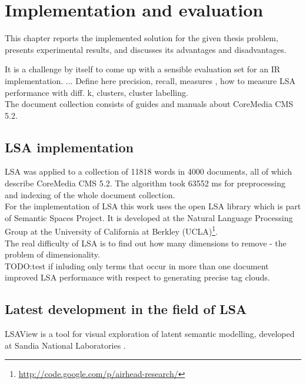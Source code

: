 \chapter{Implementation and evaluation}
\label{sec:implementation}

\begin{summary}
This chapter reports the implemented solution for the given thesis problem, presents experimental results, and discusses its advantages and disadvantages.
\end{summary}


It is a challenge by itself to come up with a sensible evaluation set for an IR implementation. ... Define here precision, recall, measures , how to measure LSA performance with  diff. k, clusters, cluster labelling. \\


The document collection consists of guides and manuals about CoreMedia \gls{CMS} 5.2.\\

\section{LSA implementation}
\label{sec:implementation:lsa_impl}
\gls{LSA} was applied to a collection of 11818 words in 4000 documents, all of which describe CoreMedia \gls{CMS} 5.2. The algorithm took  63552 ms for preprocessing and indexing of the whole document collection. \\

For the implementation of LSA this work uses the open LSA library which is part of Semantic Spaces Project\cite{S-Space}. It is developed at the Natural Language Processing Group at the University of California at Berkley (UCLA)\footnote{\url{http://code.google.com/p/airhead-research/}}.\\

The real difficulty of LSA is to find out how many dimensions to remove - the problem of dimensionality.\\

TODO:test if inluding only terms that occur in more than one document improved \gls{LSA} performance with respect to generating precise tag clouds.\\

\section{Latest development in the field of LSA}
\label{sec:lsa:latest}
LSAView is a tool for visual exploration of latent semantic modelling, developed at Sandia National Laboratories \cite{CrDuSh09}.\\

